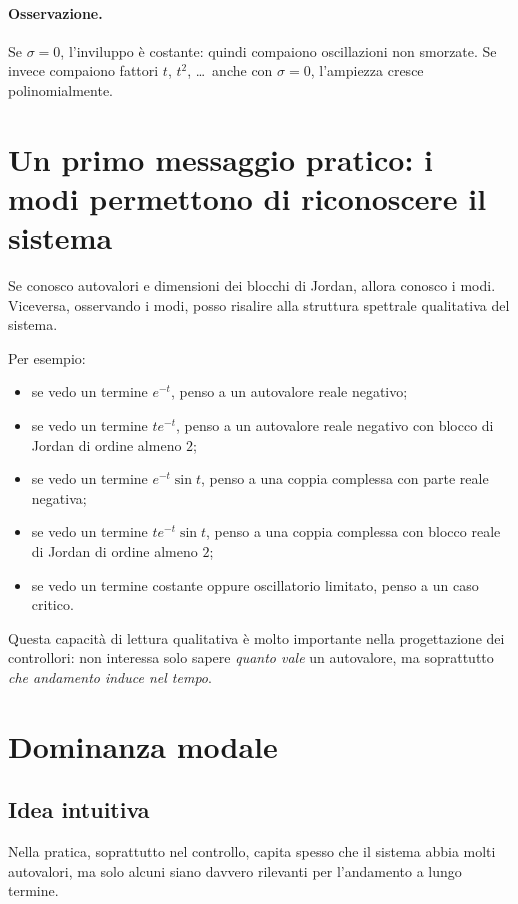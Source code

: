 \paragraph{Osservazione.}
Se $\sigma=0$, l'inviluppo è costante: quindi compaiono oscillazioni non smorzate.
Se invece compaiono fattori $t$, $t^2$, \dots\ anche con $\sigma=0$, l'ampiezza cresce polinomialmente.

\section{Un primo messaggio pratico: i modi permettono di riconoscere il sistema}

Se conosco autovalori e dimensioni dei blocchi di Jordan, allora conosco i modi.
Viceversa, osservando i modi, posso risalire alla struttura spettrale qualitativa del sistema.

Per esempio:
\begin{itemize}
    \item se vedo un termine $e^{-t}$, penso a un autovalore reale negativo;
    \item se vedo un termine $te^{-t}$, penso a un autovalore reale negativo con blocco di Jordan di ordine almeno $2$;
    \item se vedo un termine $e^{-t}\sin t$, penso a una coppia complessa con parte reale negativa;
    \item se vedo un termine $t e^{-t}\sin t$, penso a una coppia complessa con blocco reale di Jordan di ordine almeno $2$;
    \item se vedo un termine costante oppure oscillatorio limitato, penso a un caso critico.
\end{itemize}

Questa capacità di lettura qualitativa è molto importante nella progettazione dei controllori: non interessa solo sapere \emph{quanto vale} un autovalore, ma soprattutto \emph{che andamento induce nel tempo}.

\section{Dominanza modale}

\subsection{Idea intuitiva}

Nella pratica, soprattutto nel controllo, capita spesso che il sistema abbia molti autovalori, ma solo alcuni siano davvero rilevanti per l'andamento a lungo termine.

